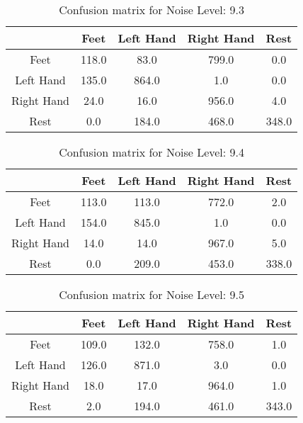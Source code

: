 \begin{table}[!htbp]
    \centering
    \begin{tabular}{|c||c|c|c|c|}
        \hline
		 & Feet & Left Hand & Right Hand & Rest \\
        \hline
        \hline
        Feet & 118.0 & 83.0 & 799.0 & 0.0 \\
        \hline
        Left Hand & 135.0 & 864.0 & 1.0 & 0.0 \\
        \hline
        Right Hand & 24.0 & 16.0 & 956.0 & 4.0 \\
        \hline
        Rest & 0.0 & 184.0 & 468.0 & 348.0 \\
        \hline
    \end{tabular}
    \caption{Confusion matrix for Noise Level: 9.3}
\end{table}

\begin{table}[!htbp]
    \centering
    \begin{tabular}{|c||c|c|c|c|}
        \hline
		 & Feet & Left Hand & Right Hand & Rest \\
        \hline
        \hline
        Feet & 113.0 & 113.0 & 772.0 & 2.0 \\
        \hline
        Left Hand & 154.0 & 845.0 & 1.0 & 0.0 \\
        \hline
        Right Hand & 14.0 & 14.0 & 967.0 & 5.0 \\
        \hline
        Rest & 0.0 & 209.0 & 453.0 & 338.0 \\
        \hline
    \end{tabular}
    \caption{Confusion matrix for Noise Level: 9.4}
\end{table}

\begin{table}[!htbp]
    \centering
    \begin{tabular}{|c||c|c|c|c|}
        \hline
		 & Feet & Left Hand & Right Hand & Rest \\
        \hline
        \hline
        Feet & 109.0 & 132.0 & 758.0 & 1.0 \\
        \hline
        Left Hand & 126.0 & 871.0 & 3.0 & 0.0 \\
        \hline
        Right Hand & 18.0 & 17.0 & 964.0 & 1.0 \\
        \hline
        Rest & 2.0 & 194.0 & 461.0 & 343.0 \\
        \hline
    \end{tabular}
    \caption{Confusion matrix for Noise Level: 9.5}
\end{table}

